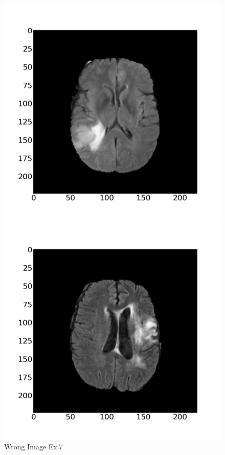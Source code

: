 \documentclass[11pt,a4j]{jarticle}
\begin{document}
\begin{figure}[ht]
	\begin{minipage}{0.32\hsize}
		\centering
		\includegraphics[width=\linewidth]{../2_MedicalImageClassification/Dataset/8.jpg}
		\vspace{-1cm}
		\renewcommand{\figurename}{Fig}
		\caption{Wrong Image Ex.7}
		\label{wp31}
	\end{minipage}
	\begin{minipage}{0.32\hsize}
		\centering
		\includegraphics[width=\linewidth]{../2_MedicalImageClassification/Dataset/83.jpg}

\end{minipage}
\end{figure}
\end{document}
